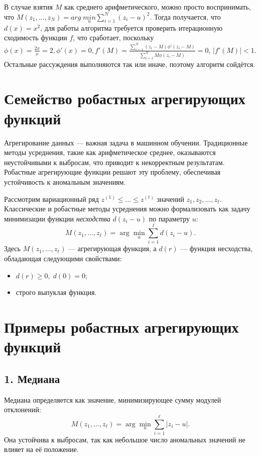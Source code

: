 \begin{solution}
    В случае взятия $M$ как среднего арифметического, можно просто воспринимать, что $M(z_1,...,z_N) = arg \; \underset{u}{min} \sum_{i=1}^N (z_i - u)^2$. Тогда получается, что $d(x) = x^2$, для работы алгоритма требуется проверить итерационную сходимость функции $f$, что сработает, поскольку $\phi (x) = \frac{2x}{x} = 2, \phi'(x) = 0, f'(M) = \frac{\sum_{i=1}^N (z_i - M) \phi'(z_i - M)}{\sum_{i=1}^N M \phi(z_i - M)} = 0$,
    $|f'(M)| < 1$. Остальные рассуждения выполняются так или иначе, поэтому алгоритм сойдётся.
\end{solution}

\section*{Семейство робастных агрегирующих функций}
Агрегирование данных — важная задача в машинном обучении. Традиционные методы усреднения, такие как арифметическое среднее, оказываются неустойчивыми к выбросам, что приводит к некорректным результатам. Робастные агрегирующие функции решают эту проблему, обеспечивая устойчивость к аномальным значениям.

Рассмотрим вариационный ряд $z^{(1)} \leq ... \leq z^{(t)}$ значений $z_1, z_2, \dots, z_\ell$. Классические и робастные методы усреднения можно формализовать как задачу минимизации функции \textit{несходства} $d(z_i - u)$ по параметру $u$:
\begin{equation}
    M(z_1, \dots, z_\ell) = \arg \min_u \sum_{i=1}^\ell d(z_i - u).
\end{equation}
Здесь $M(z_1, \dots, z_\ell)$ — агрегирующая функция, а $d(r)$ — функция несходства, обладающая следующими свойствами:
\begin{itemize}
    \item $d(r) \geq 0, \; d(0) = 0$;
    \item строго выпуклая функция.
\end{itemize}

\section*{Примеры робастных агрегирующих функций}
\subsection*{1. Медиана}
Медиана определяется как значение, минимизирующее сумму модулей отклонений:
\begin{equation}
    M(z_1, \dots, z_\ell) = \arg \min_u \sum_{i=1}^\ell |z_i - u|.
\end{equation}
Она устойчива к выбросам, так как небольшое число аномальных значений не влияет на её положение.

